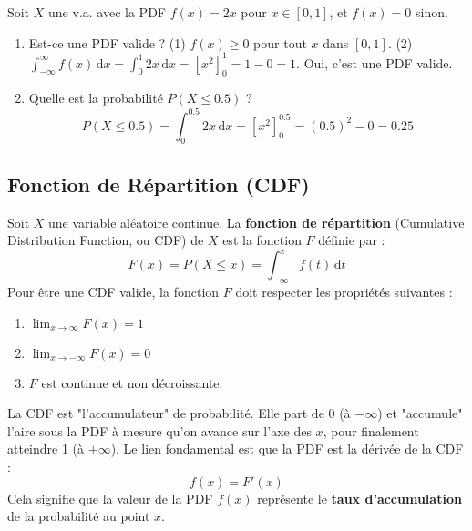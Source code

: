 \begin{examplebox}
Soit $X$ une v.a. avec la PDF $f(x) = 2x$ pour $x \in [0, 1]$, et $f(x)=0$ sinon.
\begin{enumerate}
    \item Est-ce une PDF valide ?
    \newline
    (1) $f(x) \ge 0$ pour tout $x$ dans $[0, 1]$.
    \newline
    (2) $\int_{-\infty}^{\infty} f(x) \, \mathrm{d}x = \int_0^1 2x \, \mathrm{d}x = [x^2]_0^1 = 1-0 = 1$.
    \newline
    Oui, c'est une PDF valide.
    \item Quelle est la probabilité $P(X \le 0.5)$ ?
    $$ P(X \le 0.5) = \int_0^{0.5} 2x \, \mathrm{d}x = [x^2]_0^{0.5} = (0.5)^2 - 0 = 0.25 $$
\end{enumerate}
\end{examplebox}

\subsection{Fonction de Répartition (CDF)}

\begin{definitionbox}
Soit $X$ une variable aléatoire continue. La \textbf{fonction de répartition} (Cumulative Distribution Function, ou CDF) de $X$ est la fonction $F$ définie par :
$$ F(x) = P(X \le x) = \int_{-\infty}^x f(t) \, \mathrm{d}t $$
Pour être une CDF valide, la fonction $F$ doit respecter les propriétés suivantes :
\begin{enumerate}
    \item $\lim_{x \to \infty} F(x) = 1$
    \item $\lim_{x \to -\infty} F(x) = 0$
    \item $F$ est continue et non décroissante.
\end{enumerate}
\end{definitionbox}

\begin{intuitionbox}
La CDF est "l'accumulateur" de probabilité. Elle part de 0 (à $-\infty$) et "accumule" l'aire sous la PDF à mesure qu'on avance sur l'axe des $x$, pour finalement atteindre 1 (à $+\infty$).
\newline
Le lien fondamental est que la PDF est la dérivée de la CDF :
$$ f(x) = F'(x) $$
Cela signifie que la valeur de la PDF $f(x)$ représente le \textbf{taux d'accumulation} de la probabilité au point $x$.
\end{intuitionbox}

